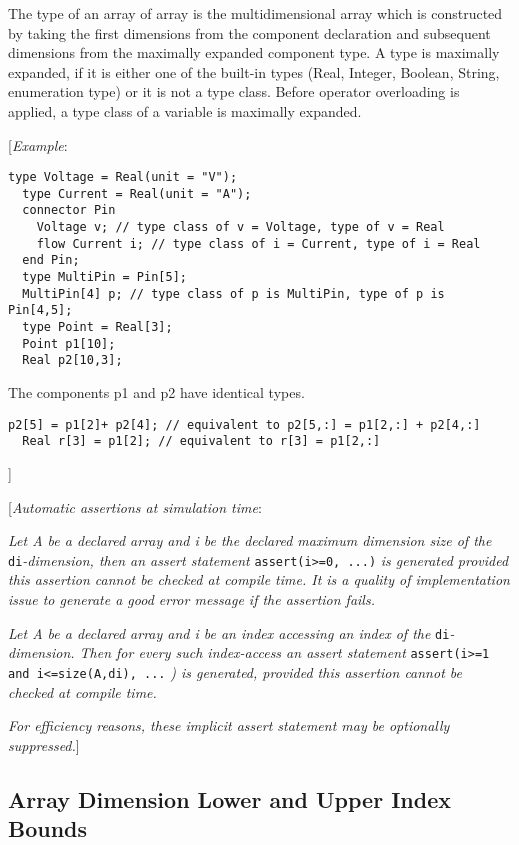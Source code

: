 The type of an array of array is the multidimensional array which is
constructed by taking the first dimensions from the component
declaration and subsequent dimensions from the maximally expanded
component type. A type is maximally expanded, if it is either one of the
built-in types (Real, Integer, Boolean, String, enumeration type) or it
is not a type class. Before operator overloading is applied, a type
class of a variable is maximally expanded.

{[}\emph{Example}:

\begin{lstlisting}[language=modelica]
  type Voltage = Real(unit = "V");
  type Current = Real(unit = "A");
  connector Pin
    Voltage v; // type class of v = Voltage, type of v = Real
    flow Current i; // type class of i = Current, type of i = Real
  end Pin;
  type MultiPin = Pin[5];
  MultiPin[4] p; // type class of p is MultiPin, type of p is Pin[4,5];
  type Point = Real[3];
  Point p1[10];
  Real p2[10,3];
\end{lstlisting}
  The components p1 and p2 have identical types.
\begin{lstlisting}[language=modelica]
  p2[5] = p1[2]+ p2[4]; // equivalent to p2[5,:] = p1[2,:] + p2[4,:]
  Real r[3] = p1[2]; // equivalent to r[3] = p1[2,:]
\end{lstlisting}
{]}

{[}\emph{Automatic assertions at simulation time}:

\emph{Let A be a declared array and i be the declared maximum dimension
size of the} \lstinline!di!\emph{-dimension, then an assert statement}
\lstinline!assert(i>=0, ...)! \emph{is generated provided this
assertion cannot be checked at compile time. It is a quality of
implementation issue to generate a good error message if the assertion
fails.}

\emph{Let A be a declared array and i be an index accessing an index of
the} \lstinline!di!\emph{-dimension. Then for every such index-access an assert
statement} \lstinline!assert(i>=1 and i<=size(A,di), ...!
\emph{) is generated, provided this assertion cannot be checked at
compile time.}

\emph{For efficiency reasons, these implicit assert statement may be
optionally suppressed.}{]}

\subsection{Array Dimension Lower and Upper Index Bounds}

